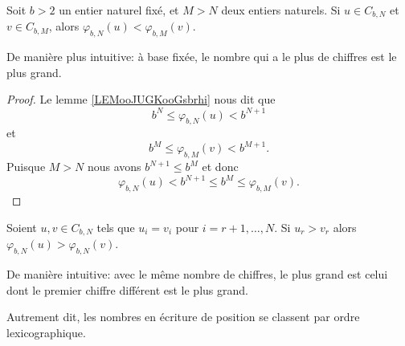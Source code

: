 \begin{proposition}	\label{PROPooComparaisonNaturelsParChiffres}
	Soit \( b > 2 \) un entier naturel fixé, et \( M>N\) deux entiers naturels. Si \( u\in C_{b,N}\) et \( v\in C_{b,M}\), alors \( \varphi_{b,N}(u)<\varphi_{b,M}(v)\).

	De manière plus intuitive: à base fixée, le nombre qui a le plus de chiffres est le plus grand.
\end{proposition}

\begin{proof}
	Le lemme  \ref{LEMooJUGKooGsbrhi} nous dit que
	\begin{equation}
		b^N\leq \varphi_{b,N}(u)< b^{N+1}
	\end{equation}
	et
	\begin{equation}
		b^M\leq \varphi_{b,M}(v)< b^{M+1}.
	\end{equation}
	Puisque \( M>N\) nous avons \( b^{N+1}\leq b^M\) et donc
	\begin{equation}
		\varphi_{b,N}(u)< b^{N+1}\leq b^M\leq \varphi_{b,M}(v).
	\end{equation}
\end{proof}

\begin{proposition}	\label{PROPooComparaisonNaturelsParChiffresIdentiques}
	Soient \( u,v\in C_{b,N}\) tels que \( u_i=v_i\) pour \( i=r+1,\ldots, N\). Si \( u_r>v_r\) alors \( \varphi_{b,N}(u)>\varphi_{b,N}(v)\).

	De manière intuitive: avec le même nombre de chiffres, le plus grand est celui dont le premier chiffre différent est le plus grand.
\end{proposition}

Autrement dit, les nombres en écriture de position se classent par ordre lexicographique.

